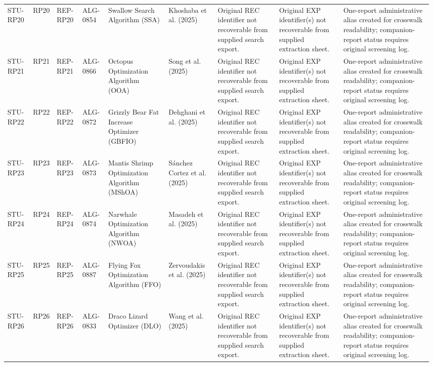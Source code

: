 \documentclass[9pt]{article}
\begin{document}
\begin{landscape}
\begin{longtable}{P{1.5cm}P{1.0cm}P{1.8cm}P{1.8cm}P{5.2cm}P{4.3cm}P{3.4cm}P{3.3cm}P{3.0cm}}
STU-RP20 & RP20 & REP-RP20 & ALG-0854 & Swallow Search Algorithm (SSA) & Khoshaba et al. (2025) & Original REC identifier not recoverable from supplied search export. & Original EXP identifier(s) not recoverable from supplied extraction sheet. & One-report administrative alias created for crosswalk readability; companion-report status requires original screening log. \\
STU-RP21 & RP21 & REP-RP21 & ALG-0866 & Octopus Optimization Algorithm (OOA) & Song et al. (2025) & Original REC identifier not recoverable from supplied search export. & Original EXP identifier(s) not recoverable from supplied extraction sheet. & One-report administrative alias created for crosswalk readability; companion-report status requires original screening log. \\
STU-RP22 & RP22 & REP-RP22 & ALG-0872 & Grizzly Bear Fat Increase Optimizer (GBFIO) & Dehghani et al. (2025) & Original REC identifier not recoverable from supplied search export. & Original EXP identifier(s) not recoverable from supplied extraction sheet. & One-report administrative alias created for crosswalk readability; companion-report status requires original screening log. \\
STU-RP23 & RP23 & REP-RP23 & ALG-0873 & Mantis Shrimp Optimization Algorithm (MShOA) & Sánchez Cortez et al. (2025) & Original REC identifier not recoverable from supplied search export. & Original EXP identifier(s) not recoverable from supplied extraction sheet. & One-report administrative alias created for crosswalk readability; companion-report status requires original screening log. \\
STU-RP24 & RP24 & REP-RP24 & ALG-0874 & Narwhale Optimization Algorithm (NWOA) & Masadeh et al. (2025) & Original REC identifier not recoverable from supplied search export. & Original EXP identifier(s) not recoverable from supplied extraction sheet. & One-report administrative alias created for crosswalk readability; companion-report status requires original screening log. \\
STU-RP25 & RP25 & REP-RP25 & ALG-0887 & Flying Fox Optimization Algorithm (FFO) & Zervoudakis et al. (2025) & Original REC identifier not recoverable from supplied search export. & Original EXP identifier(s) not recoverable from supplied extraction sheet. & One-report administrative alias created for crosswalk readability; companion-report status requires original screening log. \\
STU-RP26 & RP26 & REP-RP26 & ALG-0833 & Draco Lizard Optimizer (DLO) & Wang et al. (2025) & Original REC identifier not recoverable from supplied search export. & Original EXP identifier(s) not recoverable from supplied extraction sheet. & One-report administrative alias created for crosswalk readability; companion-report status requires original screening log. \\

\end{longtable}
\end{landscape}
\end{document}

